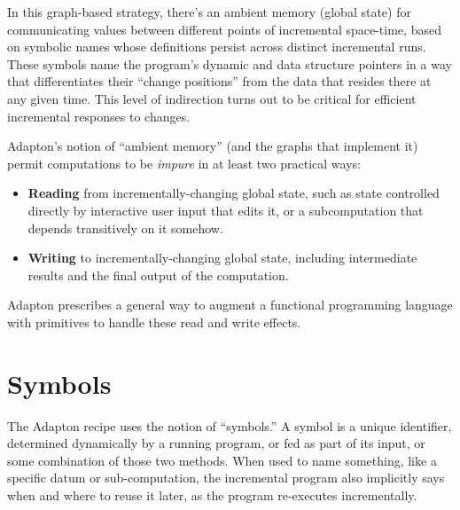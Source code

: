 \documentclass[11pt]{article}
\begin{document}
In this graph-based strategy, there's an ambient memory (global state)
for communicating values between different points of incremental
space-time, based on symbolic names whose definitions persist across
distinct incremental runs.
%
These symbols name the program's dynamic and data structure pointers
in a way that differentiates their ``change positions'' from the data
that resides there at any given time.
%
This level of indirection turns out to be critical for efficient
incremental responses to changes.

Adapton's notion of ``ambient memory'' (and the graphs that implement
it) permit computations to be \emph{impure} in at least two practical
ways:

\begin{itemize}

\item \textbf{Reading} from incrementally-changing global state, such as state controlled directly by interactive user input that edits it, or a subcomputation that depends transitively on it somehow.
  
\item \textbf{Writing} to incrementally-changing global state, including intermediate results and the final output of the computation.

\end{itemize}

Adapton prescribes a general way to augment a functional
programming language with primitives to handle these read and write effects.


\section{Symbols}

The Adapton recipe uses the notion of ``symbols.'' A symbol is a
unique identifier, determined dynamically by a running program, or fed
as part of its input, or some combination of those two methods.
%
When used to name something, like a specific datum or sub-computation,
the incremental program also implicitly says when and where to reuse
it later, as the program re-executes incrementally.

\end{document}
